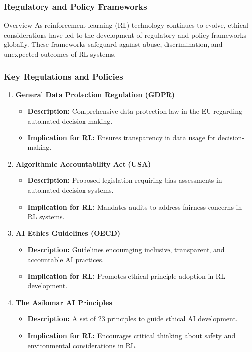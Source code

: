\documentclass[aspectratio=169]{beamer}
\begin{document}
\begin{frame}[fragile]
    \frametitle{Regulatory and Policy Frameworks}
    \begin{block}{Overview}
        As reinforcement learning (RL) technology continues to evolve, ethical considerations have led to the development of regulatory and policy frameworks globally. These frameworks safeguard against abuse, discrimination, and unexpected outcomes of RL systems.
    \end{block}
\end{frame}

\begin{frame}[fragile]
    \frametitle{Key Regulations and Policies}
    \begin{enumerate}
        \item \textbf{General Data Protection Regulation (GDPR)}
            \begin{itemize}
                \item \textbf{Description:} Comprehensive data protection law in the EU regarding automated decision-making.
                \item \textbf{Implication for RL:} Ensures transparency in data usage for decision-making.
            \end{itemize}
        \item \textbf{Algorithmic Accountability Act (USA)}
            \begin{itemize}
                \item \textbf{Description:} Proposed legislation requiring bias assessments in automated decision systems.
                \item \textbf{Implication for RL:} Mandates audits to address fairness concerns in RL systems.
            \end{itemize}
        \item \textbf{AI Ethics Guidelines (OECD)}
            \begin{itemize}
                \item \textbf{Description:} Guidelines encouraging inclusive, transparent, and accountable AI practices.
                \item \textbf{Implication for RL:} Promotes ethical principle adoption in RL development.
            \end{itemize}
        \item \textbf{The Asilomar AI Principles}
            \begin{itemize}
                \item \textbf{Description:} A set of 23 principles to guide ethical AI development.
                \item \textbf{Implication for RL:} Encourages critical thinking about safety and environmental considerations in RL.
            \end{itemize}
    \end{enumerate}
\end{frame}
\end{document}
